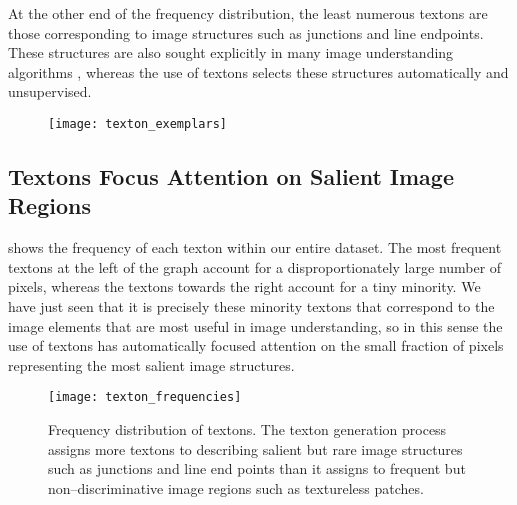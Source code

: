 At the other end of the frequency distribution, the least numerous
textons are those corresponding to image structures such as
junctions and line endpoints. These structures are also sought
explicitly in many image understanding algorithms \cite{Forsyth02},
whereas the use of textons selects these structures automatically and
unsupervised.

\begin{figure}[htp]
  \centering
  \texttt{[image: texton\_exemplars]}
  \caption{
  }
  \label{fig:textons-generated}
\end{figure}

\subsection{Textons Focus Attention on Salient Image Regions}
 shows the frequency of each texton within
our entire dataset. The most frequent textons at the left of the graph
account for a disproportionately large number of pixels, whereas the
textons towards the right account for a tiny minority. We have just
seen that it is precisely these minority textons that correspond to
the image elements that are most useful in image understanding, so in
this sense the use of textons has automatically focused attention on
the small fraction of pixels representing the most salient image
structures.

\begin{figure}[htp]
  \centering
  \texttt{[image: texton\_frequencies]}
  \caption{Frequency distribution of textons. The texton generation
    process assigns more textons to describing salient but rare image
    structures such as junctions and line end points than it assigns to
    frequent but non--discriminative image regions such as textureless
    patches.}
  \label{fig:texton-freq-distr}
\end{figure}

